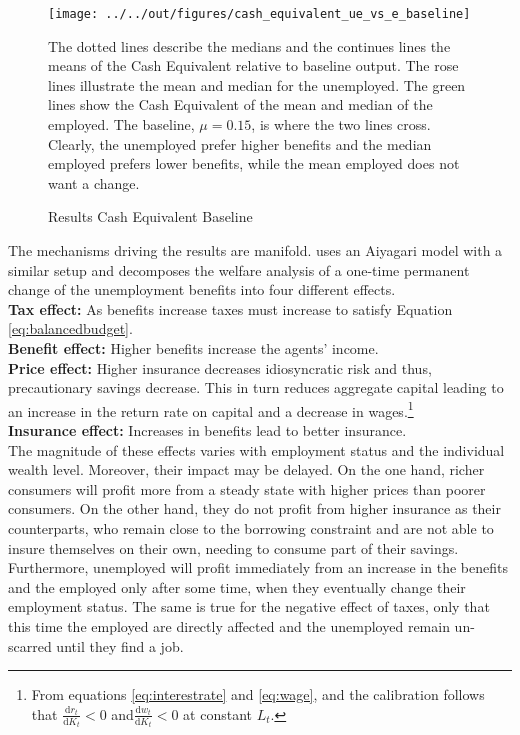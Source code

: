 \documentclass[a4paper,11pt]{article}
\begin{document}
\begin{figure}
\caption{Results Cash Equivalent Baseline } 
\label{fig:baseline_ue_vs_e}	%
\centering
\texttt{[image: ../../out/figures/cash\_equivalent\_ue\_vs\_e\_baseline]}  %

\begin{minipage}{0.8\linewidth}
\footnotesize{The dotted lines describe the medians and the continues lines the means of the Cash Equivalent relative to baseline output. The rose lines illustrate the mean and median for the unemployed. The green lines show the Cash Equivalent of the mean and median of the employed. The baseline, $\mu = 0.15$, is where the two lines cross. Clearly, the unemployed prefer higher benefits and the median employed prefers lower benefits, while the mean employed does not want a change.}
\end{minipage}

\end{figure}

The mechanisms driving the results are manifold. \cite{mukoyama2012} uses an Aiyagari model with a similar setup and decomposes the welfare analysis of a one-time permanent change of the unemployment benefits into four different effects.\\
\textbf{Tax effect:} As benefits increase taxes must increase to satisfy Equation \ref{eq:balancedbudget}.\\
\textbf{Benefit effect:} Higher benefits increase the agents' income.\\
\textbf{Price effect:} Higher insurance decreases idiosyncratic risk and thus, precautionary savings decrease. This in turn reduces aggregate capital leading to an increase in the return rate on capital and a decrease in wages.\footnote{From equations \ref{eq:interestrate} and \ref{eq:wage}, and the calibration follows that $\frac{\mathrm d r_{t}}{\mathrm d K_{t}}<0$ and$\frac{\mathrm d w_{t}}{\mathrm d K_{t}}<0$ at constant $L_{t}$.}\\
\textbf{Insurance effect:} Increases in benefits lead to better insurance. \\
The magnitude of these effects varies with employment status and the individual wealth level. Moreover, their impact may be delayed. On the one hand, richer consumers will profit more from a steady state with higher prices than poorer consumers. On the other hand, they do not profit from higher insurance as their counterparts, who remain close to the borrowing constraint and are not able to insure themselves on their own, needing to consume part of their savings. Furthermore, unemployed will profit immediately from an increase in the benefits and the employed only after some time, when they eventually change their employment status. The same is true for the negative effect of taxes, only that this time the employed are directly affected and the unemployed remain un-scarred until they find a job. 
\end{document}
